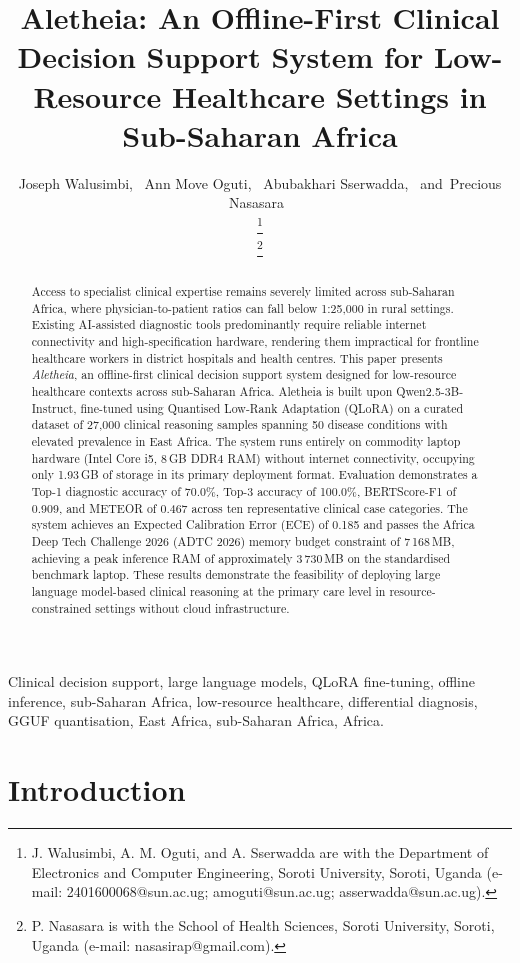 \documentclass[journal]{IEEEtran}
\title{Aletheia: An Offline-First Clinical Decision Support System
for Low-Resource Healthcare Settings in Sub-Saharan Africa}
\author{Joseph Walusimbi,~\IEEEmembership{}
  Ann Move Oguti,~\IEEEmembership{}
  Abubakhari Sserwadda,~\IEEEmembership{}
  and~Precious Nasasara~\IEEEmembership{}

\thanks{J. Walusimbi, A. M. Oguti, and A. Sserwadda are with the
Department of Electronics and Computer Engineering, Soroti University,
Soroti, Uganda (e-mail: 2401600068@sun.ac.ug; amoguti@sun.ac.ug;
asserwadda@sun.ac.ug).}

\thanks{P. Nasasara is with the School of Health Sciences,
Soroti University, Soroti, Uganda
(e-mail: nasasirap@gmail.com).}}
\begin{document}
\maketitle

\begin{abstract}
Access to specialist clinical expertise remains severely limited
across sub-Saharan Africa, where physician-to-patient ratios can
fall below 1:25{,}000 in rural settings. Existing AI-assisted
diagnostic tools predominantly require reliable internet connectivity
and high-specification hardware, rendering them impractical for
frontline healthcare workers in district hospitals and health
centres. This paper presents \textit{Aletheia}, an offline-first
clinical decision support system designed for low-resource
healthcare contexts across sub-Saharan Africa. Aletheia is built
upon Qwen2.5-3B-Instruct, fine-tuned using Quantised Low-Rank
Adaptation (QLoRA) on a curated dataset of 27{,}000 clinical
reasoning samples spanning 50 disease conditions with elevated
prevalence in East Africa. The system runs entirely on commodity
laptop hardware (Intel Core i5, 8\,GB DDR4 RAM) without internet
connectivity, occupying only 1.93\,GB of storage in its primary
deployment format. Evaluation demonstrates a Top-1 diagnostic
accuracy of 70.0\%, Top-3 accuracy of 100.0\%, BERTScore-F1 of
0.909, and METEOR of 0.467 across ten representative clinical case
categories. The system achieves an Expected Calibration Error (ECE)
of 0.185 and passes the Africa Deep Tech Challenge 2026 (ADTC 2026)
memory budget constraint of 7\,168\,MB, achieving
a peak inference RAM of approximately 3\,730\,MB on the standardised
benchmark laptop. These results demonstrate the
feasibility of deploying large language model-based clinical
reasoning at the primary care level in resource-constrained settings
without cloud infrastructure.
\end{abstract}

\begin{IEEEkeywords}
Clinical decision support, large language models, QLoRA fine-tuning,
offline inference, sub-Saharan Africa, low-resource healthcare,
differential diagnosis, GGUF quantisation, East Africa, sub-Saharan Africa, Africa.
\end{IEEEkeywords}

\section{Introduction}
\label{sec:intro}
\end{document}
